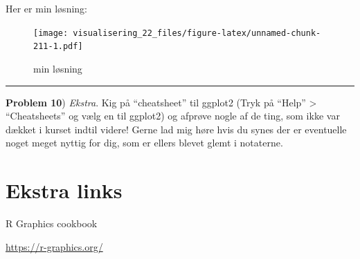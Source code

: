 \documentclass[
]{book}
\begin{document}
Her er min løsning:

\begin{figure}
\centering
\texttt{[image: visualisering\_22\_files/figure-latex/unnamed-chunk-211-1.pdf]}
\caption{\label{fig:unnamed-chunk-211}min løsning}
\end{figure}

\begin{center}\rule{0.5\linewidth}{0.5pt}\end{center}

\textbf{Problem 10}) \emph{Ekstra}. Kig på ``cheatsheet'' til ggplot2 (Tryk på ``Help'' \textgreater{} ``Cheatsheets'' og vælg en til ggplot2) og afprøve nogle af de ting, som ikke var dækket i kurset indtil videre! Gerne lad mig høre hvis du synes der er eventuelle noget meget nyttig for dig, som er ellers blevet glemt i notaterne.

\hypertarget{ekstra-links-1}{%
\section{Ekstra links}\label{ekstra-links-1}}

R Graphics cookbook

\url{https://r-graphics.org/}

  
\end{document}
